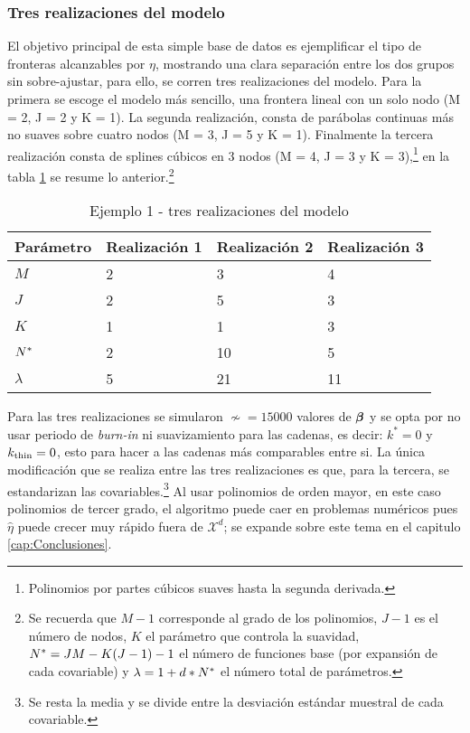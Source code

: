 \documentclass[../Main/Main.tex]{subfiles}
\begin{document}
\subsubsection*{Tres realizaciones del modelo}
El objetivo principal de esta simple base de datos es ejemplificar el tipo de fronteras alcanzables por $\eta$, mostrando una clara separación entre los dos grupos sin sobre-ajustar, para ello, se corren tres realizaciones del modelo. Para la primera se escoge el modelo más sencillo, una frontera lineal con un solo nodo (M = 2, J = 2 y K = 1). La segunda realización, consta de parábolas continuas más no suaves sobre cuatro nodos (M = 3, J = 5 y K = 1). Finalmente la tercera realización consta de splines cúbicos en 3 nodos (M = 4, J = 3 y K = 3),\footnote{Polinomios por partes cúbicos suaves hasta la segunda derivada.} en la tabla \ref{tab:Ejemplo1Modelos} se resume lo anterior.\footnote{Se recuerda que $M-1$ corresponde al grado de los polinomios, $J-1$ es el número de nodos, $K$ el parámetro que controla la suavidad, $N^* = JM - K(J-1) - 1$ el número de funciones base (por expansión de cada covariable) y $\lambda = 1 + d*N^*$ el número total de parámetros.}
\begin{table}[H]
\centering
\begin{tabular}{l|lll}
\hline
Parámetro & Realización 1 & Realización 2 & Realización 3 \\ \hline\hline
$M$       & 2        & 3        & 4        \\ \hline
$J$       & 2        & 5        & 3        \\ \hline
$K$       & 1        & 1        & 3        \\ \hline\hline
$N^*$      & 2        & 10       & 5        \\ \hline
$\lambda$ & 5        & 21       & 11       \\ \hline
\end{tabular}
\caption{Ejemplo 1 - tres realizaciones del modelo}
\label{tab:Ejemplo1Modelos}
\end{table}
Para las tres realizaciones se simularon $\nsim = \num{15000}$ valores de $\bm{\beta}$ y se opta por no usar periodo de \textit{burn-in} ni suavizamiento para las cadenas, es decir: $k^* = 0$ y $k_{\text{thin}} = 0$, esto para hacer a las cadenas más comparables entre si. La única modificación que se realiza entre las tres realizaciones es que, para la tercera, se estandarizan las covariables.\footnote{Se resta la media y se divide entre la desviación estándar muestral de cada covariable.} Al usar polinomios de orden mayor, en este caso polinomios de tercer grado, el algoritmo puede caer en problemas numéricos pues $\hat{\eta}$ puede crecer muy rápido fuera de $\mathcal{X}^d$; se expande sobre este tema en el capitulo \ref{cap:Conclusiones}. 
\end{document}
